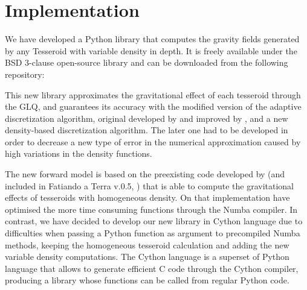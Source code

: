 \documentclass[extra]{gji}
\begin{document}


\section{Implementation}

We have developed a Python library that computes the gravity fields generated by any Tesseroid with variable density in depth.
It is freely available under the BSD 3-clause open-source library and can be downloaded from the following repository: 

This new library approximates the gravitational effect of each tesseroid through the GLQ, and guarantees its accuracy with the modified version of the adaptive discretization algorithm, original developed by \citet{Li2011} and improved by \citet{Uieda2016}, and a new density-based discretization algorithm.
The later one had to be developed in order to decrease a new type of error in the numerical approximation caused by high variations in the density functions.

The new forward model is based on the preexisting code developed by \citet{Uieda2016} (and included in Fatiando a Terra v.0.5, \citet{Uieda2013}) that is able to compute the gravitational effects of tesseroids with homogeneous density.
On that implementation \citet{Uieda2016} have optimised the more time consuming functions through the Numba compiler.
In contrast, we have decided to develop our new library in Cython language due to difficulties when passing a Python function as argument to precompiled Numba methods, keeping the homogeneous tesseroid calculation and adding the new variable density computations.
The Cython language is a superset of Python language that allows to generate efficient C code through the Cython compiler, producing a library whose functions can be called from regular Python code.
\end{document}
